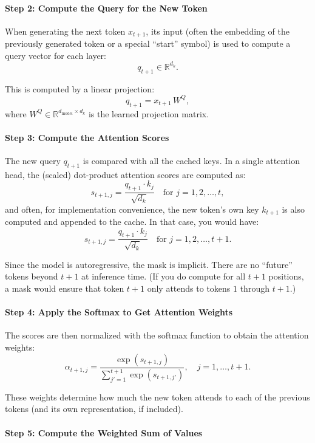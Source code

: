 \paragraph{Step 2: Compute the Query for the New Token}

When generating the next token \( x_{t+1} \), its input (often the embedding of the previously generated token or a special “start” symbol) is used to compute a query vector for each layer:
\[
q_{t+1} \in \mathbb{R}^{d_k}.
\]

This is computed by a linear projection:
\[
q_{t+1} = x_{t+1} \, W^Q,
\]
where \( W^Q \in \mathbb{R}^{d_{\text{model}} \times d_k} \) is the learned projection matrix.

\paragraph{Step 3: Compute the Attention Scores}

The new query \( q_{t+1} \) is compared with all the cached keys. In a single attention head, the (scaled) dot-product attention scores are computed as:
\[
s_{t+1,j} = \frac{q_{t+1} \cdot k_j}{\sqrt{d_k}} \quad \text{for } j=1,2,\dots,t,
\]
and often, for implementation convenience, the new token's own key \( k_{t+1} \) is also computed and appended to the cache. In that case, you would have:
\[
s_{t+1,j} = \frac{q_{t+1} \cdot k_j}{\sqrt{d_k}} \quad \text{for } j=1,2,\dots,t+1.
\]

Since the model is autoregressive, the mask is implicit. There are no ``future'' tokens beyond \( t+1 \) at inference time. (If you do compute for all \( t+1 \) positions, a mask would ensure that token \( t+1 \) only attends to tokens \( 1 \) through \( t+1 \).)

\paragraph{Step 4: Apply the Softmax to Get Attention Weights}

The scores are then normalized with the softmax function to obtain the attention weights:
\[
\alpha_{t+1,j} = \frac{\exp(s_{t+1,j})}{\sum_{j'=1}^{t+1} \exp(s_{t+1,j'})}, \quad j = 1,\dots,t+1.
\]

These weights determine how much the new token attends to each of the previous tokens (and its own representation, if included).

\paragraph{Step 5: Compute the Weighted Sum of Values}

